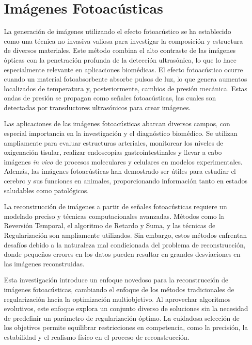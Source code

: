 \section{Imágenes Fotoacústicas} \label{sec:intro}

La generación de imágenes utilizando el efecto fotoacústico se ha establecido como una técnica no invasiva valiosa para investigar la composición y estructura de diversos materiales. Este método combina el alto contraste de las imágenes ópticas con la penetración profunda de la detección ultrasónica, lo que lo hace especialmente relevante en aplicaciones biomédicas. El efecto fotoacústico ocurre cuando un material fotoabsorbente absorbe pulsos de luz, lo que genera aumentos localizados de temperatura y, posteriormente, cambios de presión mecánica. Estas ondas de presión se propagan como señales fotoacústicas, las cuales son detectadas por transductores ultrasónicos para crear imágenes.

Las aplicaciones de las imágenes fotoacústicas abarcan diversos campos, con especial importancia en la investigación y el diagnóstico biomédico. Se utilizan ampliamente para evaluar estructuras arteriales, monitorear los niveles de oxigenación tisular, realizar endoscopias gastrointestinales y llevar a cabo imágenes \textit{in vivo} de procesos moleculares y celulares en modelos experimentales. Además, las imágenes fotoacústicas han demostrado ser útiles para estudiar el cerebro y sus funciones en animales, proporcionando información tanto en estados saludables como patológicos.

La reconstrucción de imágenes a partir de señales fotoacústicas requiere un modelado preciso y técnicas computacionales avanzadas. Métodos como la Reversión Temporal, el algoritmo de Retardo y Suma, y las técnicas de Regularización son ampliamente utilizados. Sin embargo, estos métodos enfrentan desafíos debido a la naturaleza mal condicionada del problema de reconstrucción, donde pequeños errores en los datos pueden resultar en grandes desviaciones en las imágenes reconstruidas.

Esta investigación introduce un enfoque novedoso para la reconstrucción de imágenes fotoacústicas, cambiando el enfoque de los métodos tradicionales de regularización hacia la optimización multiobjetivo. Al aprovechar algoritmos evolutivos, este enfoque explora un conjunto diverso de soluciones sin la necesidad de predefinir un parámetro de regularización óptimo. La cuidadosa selección de los objetivos permite equilibrar restricciones en competencia, como la precisión, la estabilidad y el realismo físico en el proceso de reconstrucción.


